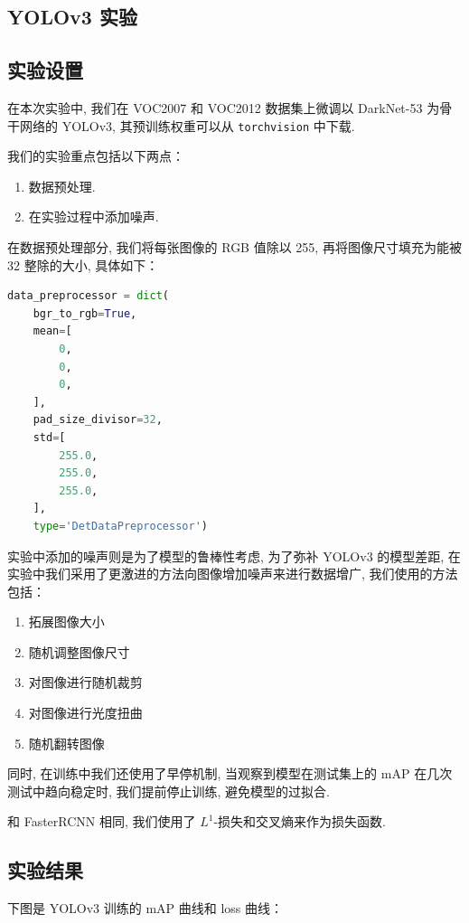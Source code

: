 \documentclass[notitlepage,cs4size,punct,oneside]{ctexrep}
\numberwithin{equation}{chapter}
\theoremstyle{mystyle}
\begin{document}
\subsection{YOLOv3 实验}
\subsection{实验设置}
在本次实验中, 我们在 VOC2007 和 VOC2012 数据集上微调以 DarkNet-53 为骨干网络的 YOLOv3, 其预训练权重可以从 \lstinline|torchvision| 中下载.

我们的实验重点包括以下两点：

\begin{enumerate}
    \item 数据预处理.
    \item 在实验过程中添加噪声.
\end{enumerate}

在数据预处理部分, 我们将每张图像的 RGB 值除以 255, 再将图像尺寸填充为能被 32 整除的大小, 具体如下：

\begin{lstlisting}[language=Python]
data_preprocessor = dict(
    bgr_to_rgb=True,
    mean=[
        0,
        0,
        0,
    ],
    pad_size_divisor=32,
    std=[
        255.0,
        255.0,
        255.0,
    ],
    type='DetDataPreprocessor')
\end{lstlisting}

实验中添加的噪声则是为了模型的鲁棒性考虑, 为了弥补 YOLOv3 的模型差距, 在实验中我们采用了更激进的方法向图像增加噪声来进行数据增广, 我们使用的方法包括：

\begin{enumerate}
    \item 拓展图像大小
    \item 随机调整图像尺寸
    \item 对图像进行随机裁剪
    \item 对图像进行光度扭曲
    \item 随机翻转图像
\end{enumerate}

同时, 在训练中我们还使用了早停机制, 当观察到模型在测试集上的 mAP 在几次测试中趋向稳定时, 我们提前停止训练, 避免模型的过拟合.

和 FasterRCNN 相同, 我们使用了 $L^{1}$-损失和交叉熵来作为损失函数.
\subsection{实验结果}

下图是 YOLOv3 训练的 mAP 曲线和 loss 曲线：
\end{document}
